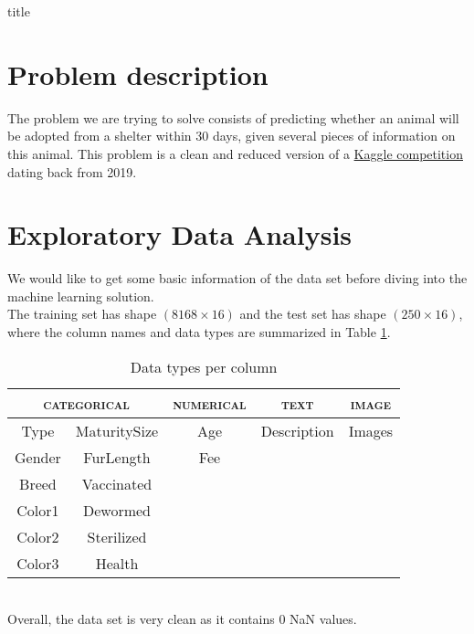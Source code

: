 \documentclass[12pt]{article}
\begin{document}
{title}

\tableofcontents
\listoffigures
\listoftables


\section{Problem description}
The problem we are trying to solve consists of predicting whether an animal will be adopted from a shelter within 30 days, given several pieces of information on this animal. This problem is a clean and reduced version of a \href{https://www.kaggle.com/c/petfinder-adoption-prediction/overview}{Kaggle competition} dating back from 2019.

\section{Exploratory Data Analysis}
\label{sec: EDA}
We would like to get some basic information of the data set before diving into the machine learning solution. \\
The training set has shape \((8168 \times 16)\) and the test set has shape \((250 \times 16)\), where the column names and data types are summarized in Table \ref{table: column data type}. \\
\begin{table}[ht]
    \centering
    \begin{tabular}{ccccc}
        \toprule
        \multicolumn{2}{c}{\textsc{categorical}} & \textsc{numerical} & \textsc{text} & \textsc{image}          \\ \midrule
        Type                                     & MaturitySize       & Age           & Description    & Images \\
        Gender                                   & FurLength          & Fee                                     \\
        Breed                                    & Vaccinated                                                   \\
        Color1                                   & Dewormed                                                     \\
        Color2                                   & Sterilized                                                   \\
        Color3                                   & Health                                                       \\
        \bottomrule
    \end{tabular}
    \caption{Data types per column}
    \label{table: column data type}
\end{table} \\
Overall, the data set is very clean as it contains 0 NaN values.
\end{document}
